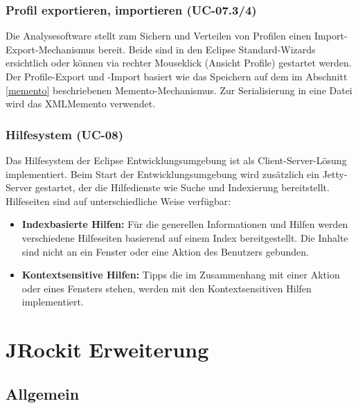 \subsubsection{Profil exportieren, importieren (UC-07.3/4)}
Die Analysesoftware stellt zum Sichern und Verteilen von Profilen einen Import-Export-Mechanismus bereit. Beide sind in den Eclipse Standard-Wizards ersichtlich oder können via rechter Mouseklick (Ansicht Profile) gestartet werden. Der Profile-Export und -Import basiert wie das Speichern auf dem im Abschnitt \ref{memento} beschriebenen Memento-Mechanismus. Zur Serialisierung in eine Datei wird das XMLMemento verwendet. 

\subsubsection{Hilfesystem (UC-08)}
Das Hilfesystem der Eclipse Entwicklungsumgebung ist als Client-Server-Lösung implementiert. Beim Start der Entwicklungsumgebung wird zusätzlich ein Jetty-Server gestartet, der die Hilfedienste wie Suche und Indexierung bereitstellt. Hilfeseiten sind auf unterschiedliche Weise verfügbar:
\begin{itemize}
\item \textbf{Indexbasierte Hilfen:} Für die generellen Informationen und Hilfen werden verschiedene Hilfeseiten basierend auf einem Index bereitgestellt. Die Inhalte sind nicht an ein Fenster oder eine Aktion des Benutzers gebunden. 
\item \textbf{Kontextsensitive Hilfen:} Tipps die im Zusammenhang mit einer Aktion oder eines Fensters stehen, werden mit den Kontextsensitiven Hilfen implementiert.
\end{itemize}



\section{JRockit Erweiterung}
\subsection{Allgemein}
